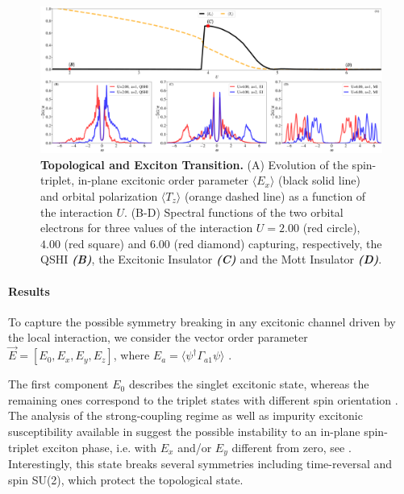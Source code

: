 \documentclass[edipack_sp.tex]{subfiles}
\begin{document}
\begin{figure}[t!]
  \includegraphics[width=\linewidth]{figures/figBHZ.pdf}
    \caption{\label{figEx4}%
      \textbf{Topological and Exciton Transition.}
      (A) Evolution of the spin-triplet,
      in-plane excitonic order parameter $\langle E_x\rangle$ (black solid line) and
      orbital polarization $\langle T_z\rangle$ (orange dashed line) as a function of the
      interaction $U$.
      (B-D) Spectral functions of the two orbital electrons for three
      values of the interaction $U=2.00$ (red circle), $4.00$ (red
      square) and $6.00$ (red diamond) capturing, respectively, the
      QSHI \textbf{\textit{(B)}}, the Excitonic Insulator \textbf{\textit{(C)}} and the Mott Insulator
      \textbf{\textit{(D)}}. 
    }
\end{figure}

\paragraph{Results}
To capture the possible symmetry breaking in any excitonic channel
driven by the local interaction, we consider the vector order
parameter
$\vec{E}=[E_0,E_x,E_y,E_z]$, where $E_a=\langle\psi^\dagger
\Gamma_{a1}\psi \rangle$ \cite{Budich2014PRL,Kunes2014PRB,Kaneko2015JOPCS,Kunes2015JOPCM,Knolle2017PRL,Guerci2019PRM,Geffroy2019PRL,Mazza2020PRL,De-Palo2023PRB}.

The first component $E_0$ describes the singlet excitonic state,
whereas the remaining ones correspond to the triplet states with
different spin orientation \cite{Blason2020PRB,Amaricci2023PRB}.   
The analysis of the strong-coupling regime as well as impurity
excitonic susceptibility available in \NAME suggest the possible
instability to an in-plane spin-triplet exciton phase, i.e. with $E_x$
and/or $E_y$ different from zero, see \cite{Amaricci2023PRB}.
Interestingly, this state breaks several symmetries including
time-reversal and spin SU(2), which protect the topological state.
\end{document}
